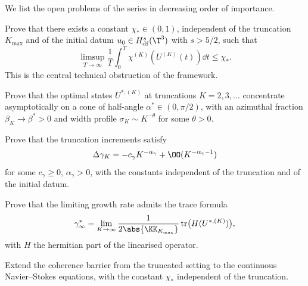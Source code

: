 We list the open problems of the series in decreasing order of 
importance.

\begin{openquestion}
\label{oq:uniformity}
Prove that there exists a constant $\chi_\ast\in(0,1)$, independent 
of the truncation $K_{\max}$ and of the initial datum 
$u_0\in H^s_{\mathrm{df}}(\T^3)$ with $s>5/2$, such that
\begin{equation}\label{eq:oq-uniformity}
\limsup_{T\to\infty}\frac{1}{T}\int_0^T\chi^{(K)}(U^{(K)}(t))\dd t 
\leq\chi_\ast.
\end{equation}
This is the central technical obstruction of the framework.
\end{openquestion}

\begin{openquestion}
\label{oq:spiral-cone}
Prove that the optimal states $U^{\ast,(K)}$ at truncations 
$K=2,3,\ldots$ concentrate asymptotically on a cone of half-angle 
$\alpha^\ast\in(0,\pi/2)$, with an azimuthal fraction 
$\beta_K\to\beta^\ast>0$ and width profile 
$\sigma_K\sim K^{-\theta}$ for some $\theta>0$.
\end{openquestion}

\begin{openquestion}
\label{oq:increments}
Prove that the truncation increments satisfy
\begin{equation}\label{eq:oq-increments}
\Delta\gamma_K = -c_\gamma K^{-\alpha_\gamma} + 
\OO(K^{-\alpha_\gamma-1})
\end{equation}
for some $c_\gamma\geq0$, $\alpha_\gamma>0$, with the constants 
independent of the truncation and of the initial datum.
\end{openquestion}

\begin{openquestion}
\label{oq:trace}
Prove that the limiting growth rate admits the trace formula
\begin{equation}\label{eq:oq-trace}
\gamma^\ast_\infty = 
\lim_{K\to\infty}\frac{1}{2\abs{\KK_{K_{\max}}}}
\operatorname{tr}\bigl(H(U^{\ast,(K)})\bigr),
\end{equation}
with $H$ the hermitian part of the linearised operator.
\end{openquestion}

\begin{openquestion}
\label{oq:continuum}
Extend the coherence barrier from the truncated setting to the 
continuous Navier--Stokes equations, with the constant $\chi_\ast$ 
independent of the truncation.
\end{openquestion}


